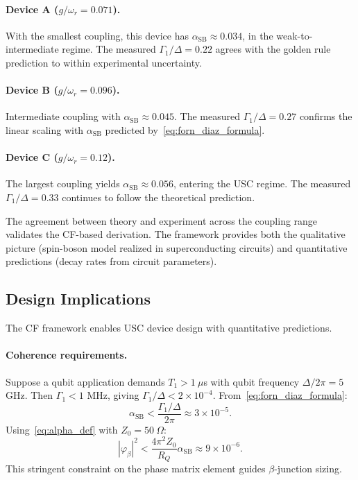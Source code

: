 \documentclass[reprint, floatfix, superscriptaddress, amsmath, amssymb, longbibliography]{revtex4-2}
\begin{document}
\paragraph{Device A ($g/\omega_r = 0.071$).} With the smallest coupling, this device has $\alpha_{\mathrm{SB}} \approx 0.034$, in the weak-to-intermediate regime. The measured $\Gamma_1/\Delta = 0.22$ agrees with the golden rule prediction to within experimental uncertainty.

\paragraph{Device B ($g/\omega_r = 0.096$).} Intermediate coupling with $\alpha_{\mathrm{SB}} \approx 0.045$. The measured $\Gamma_1/\Delta = 0.27$ confirms the linear scaling with $\alpha_{\mathrm{SB}}$ predicted by~\eqref{eq:forn_diaz_formula}.

\paragraph{Device C ($g/\omega_r = 0.12$).} The largest coupling yields $\alpha_{\mathrm{SB}} \approx 0.056$, entering the USC regime. The measured $\Gamma_1/\Delta = 0.33$ continues to follow the theoretical prediction.

The agreement between theory and experiment across the coupling range validates the CF-based derivation. The framework provides both the qualitative picture (spin-boson model realized in superconducting circuits) and quantitative predictions (decay rates from circuit parameters).

\subsection{Design Implications}
\label{sec:usc_design}

The CF framework enables USC device design with quantitative predictions.

\paragraph{Coherence requirements.} Suppose a qubit application demands $T_1 > 1~\mu$s with qubit frequency $\Delta/2\pi = 5$ GHz. Then $\Gamma_1 < 1$ MHz, giving $\Gamma_1/\Delta < 2 \times 10^{-4}$. From~\eqref{eq:forn_diaz_formula}:
\begin{equation}
\alpha_{\mathrm{SB}} < \frac{\Gamma_1/\Delta}{2\pi} \approx 3 \times 10^{-5}.
\label{eq:alpha_bound}
\end{equation}
Using~\eqref{eq:alpha_def} with $Z_0 = 50~\Omega$:
\begin{equation}
|\varphi_\beta|^2 < \frac{4\pi^2 Z_0}{R_Q}\alpha_{\mathrm{SB}} \approx 9 \times 10^{-6}.
\label{eq:phi_bound}
\end{equation}
This stringent constraint on the phase matrix element guides $\beta$-junction sizing.
\end{document}
